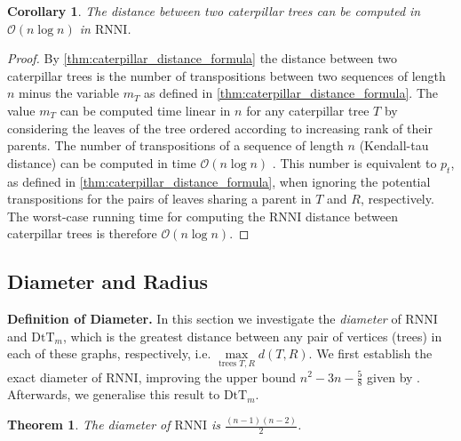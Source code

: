 \documentclass[11pt]{amsart}
\newtheorem{theorem}{Theorem}
\newtheorem{corollary}{Corollary}
\newcommand{\rnni}{\mathrm{RNNI}}
\newcommand{\dtt}{\mathrm{DtT}}
\renewcommand{\O}{\mathcal O}
\newcommand{\summary}[1]{\textbf{#1}} %
\begin{document}
\todo{Can this somehow be used in $\dtt_m$?}

\begin{corollary}
	The distance between two caterpillar trees can be computed in $\O(n \log n)$ in $\rnni$.
	\label{cor:caterpillar_distance_rnni_nlogn}
\end{corollary}

\begin{proof}
	By \autoref{thm:caterpillar_distance_formula} the distance between two caterpillar trees is the number of transpositions between two sequences of length $n$ minus the variable $m_T$ as defined in \autoref{thm:caterpillar_distance_formula}.
	The value $m_T$ can be computed time linear in $n$ for any caterpillar tree $T$ by considering the leaves of the tree ordered according to increasing rank of their parents.
	The number of transpositions of a sequence of length $n$ (Kendall-tau distance) can be computed in time $\O(n \log n)$ \autocite{Knight1966-hx}.
	This number is equivalent to $p_t$, as defined in \autoref{thm:caterpillar_distance_formula}, when ignoring the potential transpositions for the pairs of leaves sharing a parent in $T$ and $R$, respectively.
	The worst-case running time for computing the $\rnni$ distance between caterpillar trees is therefore $\O(n \log n)$.
\end{proof}

\subsection{Diameter and Radius}

\summary{Definition of Diameter.}
In this section we  investigate the \emph{diameter} of $\rnni$ and $\dtt_m$, which is the greatest distance between any pair of vertices (trees) in each of these graphs, respectively, i.e. $\max\limits_{\text{trees }T,R}d(T,R)$.
We first establish the exact diameter of $\rnni$, improving the upper bound $n^2 - 3n - \frac{5}{8}$ given by \textcite{Gavryushkin2018-ol}.
Afterwards, we generalise this result to $\dtt_m$.

\begin{theorem}
	The diameter of $\rnni$ is $\frac{(n-1)(n-2)}{2}$.
	\label{thm:diameter_rnni}
\end{theorem}
\end{document}
